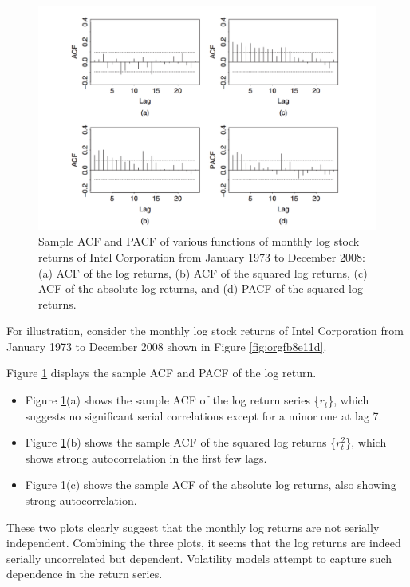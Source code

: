 \documentclass[a4paper,11pt]{article}
\begin{document}
\begin{figure}[htbp]
\centering
\includegraphics[width=\textwidth]{img/acf_intel.png}
\caption{\label{fig:org9148e1a}
Sample ACF and PACF of various functions of monthly log stock returns of Intel Corporation from January 1973 to December 2008: (a) ACF of the log returns, (b) ACF of the squared log returns, (c) ACF of the absolute log returns, and (d) PACF of the squared log returns.}
\end{figure}

For illustration, consider the monthly log stock returns of Intel
Corporation from January 1973 to December 2008 shown in Figure
\ref{fig:orgfb8e11d}.

Figure \ref{fig:org9148e1a} displays the sample ACF and PACF of the
log return.
\begin{itemize}
\item Figure \ref{fig:org9148e1a}(a) shows the sample ACF of the log
return series \{\(r_t\)\}, which suggests no significant serial correlations
except for a minor one at lag 7.
\item Figure \ref{fig:org9148e1a}(b) shows the sample ACF of the squared log returns
\{\(r^2_t\)\}, which shows strong autocorrelation in the first few
lags.
\item Figure  \ref{fig:org9148e1a}(c) shows the sample ACF of the
absolute log returns, also showing strong autocorrelation.
\end{itemize}

These two plots clearly suggest that the monthly log returns are not
serially independent. Combining the three plots, it seems that the
log returns are indeed serially uncorrelated but
dependent. Volatility models attempt to capture such dependence in
the return series.
\end{document}
